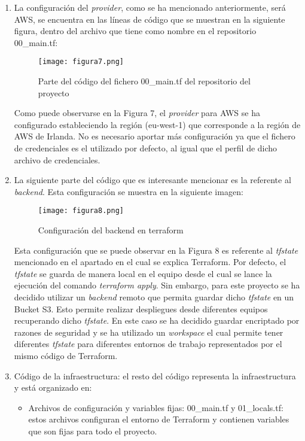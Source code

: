 \documentclass[../../memoria.tex]{subfiles}
\begin{document}
\begin{enumerate}
    \item La configuración del \textit{provider}, como se ha mencionado anteriormente, será AWS, se encuentra en las líneas de código que se muestran en la siguiente figura, dentro del archivo que tiene como nombre en el repositorio 00\_main.tf:
          \begin{figure}[H]
              \centering
              \texttt{[image: figura7.png]}
              \caption{Parte del código del fichero 00\_main.tf del repositorio del proyecto}
              \label{fig:figura7}
          \end{figure}
          Como puede observarse en la Figura 7, el \textit{provider} para AWS se ha configurado estableciendo la región (eu-west-1) que corresponde a la región de AWS de Irlanda. No es necesario aportar más configuración ya que el fichero de credenciales es el utilizado por defecto, al igual que el perfil de dicho archivo de credenciales.

    \item La siguiente parte del código que es interesante mencionar es la referente al \textit{backend}. Esta configuración se muestra en la siguiente imagen:
          \begin{figure}[H]
              \centering
              \texttt{[image: figura8.png]}
              \caption{Configuración del backend en terraform }
              \label{fig:figura8}
          \end{figure}
          Esta configuración que se puede observar en la Figura 8 es referente al \textit{tfstate} mencionado en el apartado en el cual se explica Terraform. Por defecto, el \textit{tfstate} se guarda de manera local en el equipo desde el cual se lance la ejecución del comando \textit{terraform apply}. Sin embargo, para este proyecto se ha decidido utilizar un \textit{backend} remoto que permita guardar dicho \textit{tfstate} en un Bucket S3. Esto permite realizar despliegues desde diferentes equipos recuperando dicho \textit{tfstate}. En este caso se ha decidido guardar encriptado por razones de seguridad y se ha utilizado un \textit{workspace} el cual permite tener diferentes \textit{tfstate} para diferentes entornos de trabajo representados por el mismo código de Terraform.

    \item Código de la infraestructura: el resto del código representa la infraestructura y está organizado en:
          \begin{itemize}
              \item Archivos de configuración y variables fijas: 00\_main.tf y 01\_locals.tf: estos archivos configuran el entorno de Terraform y contienen variables que son fijas para todo el proyecto.


\end{itemize}
\end{enumerate}
\end{document}
